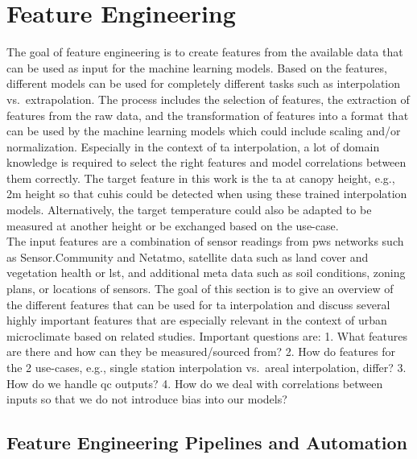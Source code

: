 \section{Feature Engineering}
\label{sec:feature_engineering}

The goal of feature engineering is to create features from the available data that can be used as input for the machine learning models. Based on the features, different models can be used for completely different tasks such as interpolation vs.\ extrapolation. The process includes the selection of features, the extraction of features from the raw data, and the transformation of features into a format that can be used by the machine learning models which could include scaling and/or normalization. Especially in the context of \gls{ta} interpolation, a lot of domain knowledge is required to select the right features and model correlations between them correctly. The target feature in this work is the \gls{ta} at canopy height, e.g., 2m height so that \gls{cuhi}s could be detected when using these trained interpolation models. Alternatively, the target temperature could also be adapted to be measured at another height or be exchanged based on the use-case.\\
The input features are a combination of sensor readings from \gls{pws} networks such as Sensor.Community and Netatmo, satellite data such as land cover and vegetation health or \gls{lst}, and additional meta data such as soil conditions, zoning plans, or locations of sensors. The goal of this section is to give an overview of the different features that can be used for \gls{ta} interpolation and discuss several highly important features that are especially relevant in the context of urban microclimate based on related studies. Important questions are: 1. What features are there and how can they be measured/sourced from? 2. How do features for the 2 use-cases, e.g., single station interpolation vs.\ areal interpolation, differ? 3. How do we handle \gls{qc} outputs? 4. How do we deal with correlations between inputs so that we do not introduce bias into our models?

\subsection{Feature Engineering Pipelines and Automation}

